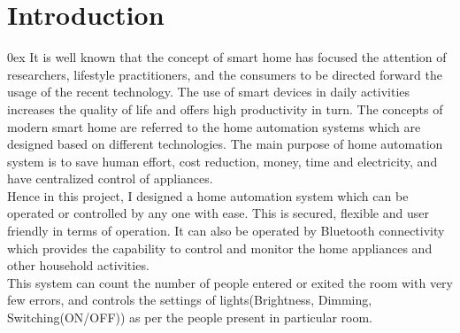 \documentclass[11pt,a4paper]{article}
\begin{document}


\renewcommand\contentsname{\LARGE\textsc{CONTENTS}}

\tableofcontents
\thispagestyle{empty} %
\clearpage %

\setcounter{page}{1} %

\section{Introduction}

\parindent 0ex %
It is well known that the concept of smart home has focused the attention of researchers, lifestyle practitioners, and the consumers to be directed forward the usage of the recent technology. The use of smart devices in daily activities increases the quality of life and offers high productivity in turn. The concepts of modern smart home are referred to the home automation systems which are designed based on different technologies. The main purpose of home automation system is to save human effort, cost reduction, money, time and electricity, and have centralized control of appliances.\\

Hence in this project, I designed a home automation system which can be operated or controlled by any one with ease. This is secured, flexible and user friendly in terms of operation. It can also be operated by Bluetooth connectivity which provides the capability to control and monitor the home appliances and other household activities.\\ 

This system can count the number of people entered or exited the room with very few errors, and controls the settings of lights(Brightness, Dimming, Switching(ON/OFF)) as per the people present in particular room.\\
\end{document}
